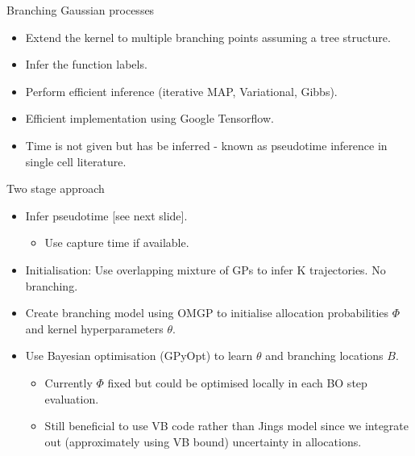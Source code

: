 \documentclass[ignorenonframetext]{beamer}
\begin{document}
\begin{frame}{Branching Gaussian processes}
\begin{itemize}
\item Extend the kernel to multiple branching points assuming a tree structure. 
\item Infer the function labels.
\item Perform efficient inference (iterative MAP, Variational, Gibbs).
\item Efficient implementation using Google Tensorflow.
\item Time is not given but has be inferred - known as pseudotime inference in single cell literature.
\end{itemize}
\end{frame}


\begin{frame}{Two stage approach}
\begin{itemize}
\item Infer pseudotime [see next slide].
	\begin{itemize}
    	\item Use capture time if available.
\end{itemize}
\item Initialisation: Use overlapping mixture of GPs to infer K trajectories. No branching.
\item Create branching model using OMGP to initialise allocation probabilities $\Phi$ and kernel hyperparameters $\theta$.
	
\item Use Bayesian optimisation (GPyOpt) to learn $\theta$ and branching locations $B$.
	\begin{itemize}
   	\item Currently $\Phi$ fixed but could be optimised locally in each BO step evaluation.
   	\item Still beneficial to use VB code rather than Jings model since we integrate out (approximately using VB bound) uncertainty in allocations.
   	\end{itemize}
\end{itemize}
\end{frame}
\end{document}
